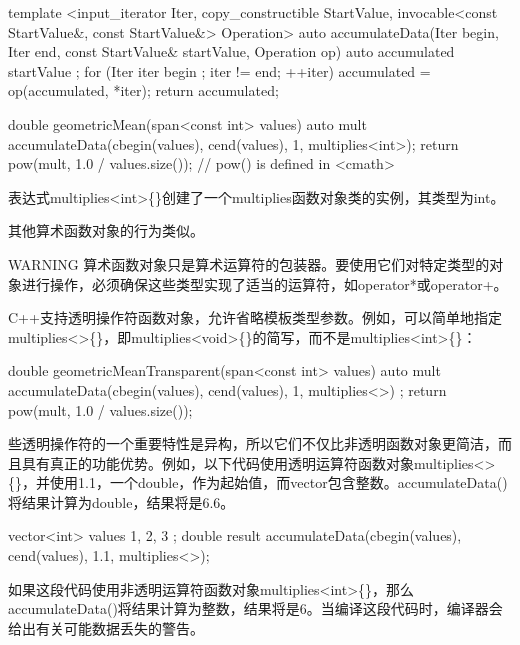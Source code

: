 \begin{cpp}
template <input_iterator Iter, copy_constructible StartValue,
          invocable<const StartValue&, const StartValue&> Operation>
auto accumulateData(Iter begin, Iter end,
    const StartValue& startValue, Operation op)
{
    auto accumulated { startValue };
    for (Iter iter { begin }; iter != end; ++iter) {
        accumulated = op(accumulated, *iter);
    }
    return accumulated;
}

double geometricMean(span<const int> values)
{
    auto mult {accumulateData(cbegin(values), cend(values), 1, multiplies<int>{})};
    return pow(mult, 1.0 / values.size()); // pow() is defined in <cmath>
}
\end{cpp}

表达式multiplies<int>\{\}创建了一个multiplies函数对象类的实例，其类型为int。

其他算术函数对象的行为类似。

\begin{myWarning}{WARNING}
算术函数对象只是算术运算符的包装器。要使用它们对特定类型的对象进行操作，必须确保这些类型实现了适当的运算符，如operator*或operator+。
\end{myWarning}


C++支持透明操作符函数对象，允许省略模板类型参数。例如，可以简单地指定multiplies<>\{\}，即multiplies<void>\{\}的简写，而不是multiplies<int>\{\}：

\begin{cpp}
double geometricMeanTransparent(span<const int> values)
{
    auto mult { accumulateData(cbegin(values), cend(values), 1, multiplies<>{}) };
    return pow(mult, 1.0 / values.size());
}
\end{cpp}

些透明操作符的一个重要特性是异构，所以它们不仅比非透明函数对象更简洁，而且具有真正的功能优势。例如，以下代码使用透明运算符函数对象multiplies<>\{\}，并使用1.1，一个double，作为起始值，而vector包含整数。accumulateData()将结果计算为double，结果将是6.6。

\begin{cpp}
vector<int> values { 1, 2, 3 };
double result {accumulateData(cbegin(values), cend(values), 1.1, multiplies<>{})};
\end{cpp}

如果这段代码使用非透明运算符函数对象multiplies<int>\{\}，那么accumulateData()将结果计算为整数，结果将是6。当编译这段代码时，编译器会给出有关可能数据丢失的警告。

